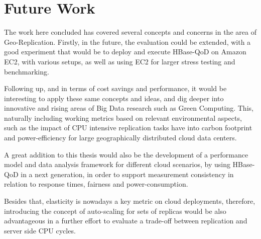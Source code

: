 \section{Future Work}
The work here concluded has covered several concepts and concerns in the area of Geo-Replication. Firstly, in the future, the evaluation could be extended, with a good experiment that would be to deploy and execute HBase-QoD on Amazon EC2, with various setups, as well as using EC2 for larger stress testing and benchmarking.

Following up, and in terms of cost savings and performance, it would be interesting to apply these same concepts and ideas, and dig deeper into innovative and rising areas of Big Data research such as Green Computing. This, naturally including working metrics based on relevant environmental aspects, such as the impact of CPU intensive replication tasks have into carbon footprint and power-efficiency for large geographically distributed cloud data centers.

A great addition to this thesis would also be the development of a performance model and data analysis framework for different cloud scenarios, by using HBase-QoD in a next generation, in order to support measurement consistency in relation to response times, fairness and power-consumption. 

Besides that, elasticity is nowadays a key metric on cloud deployments, therefore, introducing the concept of auto-scaling for sets of replicas would be also advantageous in a further effort to evaluate a trade-off between replication and server side CPU cycles.     